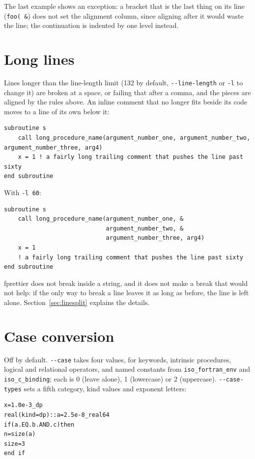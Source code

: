 \documentclass[11pt,a4paper,openany]{book}
\newcommand{\code}[1]{\texttt{\small #1}}
\newcommand{\flag}[1]{\texttt{\small -{}-#1}}
\begin{document}
The last example shows an exception: a bracket that is the last thing on its
line (\code{foo( \&}) does not set the alignment column, since aligning after
it would waste the line; the continuation is indented by one level instead.

\section{Long lines}

Lines longer than the line-length limit (132 by default, \flag{line-length}
or \code{-l} to change it) are broken at a space, or failing that after a comma,
and the pieces are aligned by the rules above. An inline comment that no longer
fits beside its code moves to a line of its own below it:

\begin{lstlisting}[style=before]
subroutine s
    call long_procedure_name(argument_number_one, argument_number_two, argument_number_three, arg4)
    x = 1 ! a fairly long trailing comment that pushes the line past sixty
end subroutine
\end{lstlisting}

With \code{-l 60}:

\begin{lstlisting}[style=after]
subroutine s
    call long_procedure_name(argument_number_one, &
                             argument_number_two, &
                             argument_number_three, arg4)
    x = 1
    ! a fairly long trailing comment that pushes the line past sixty
end subroutine
\end{lstlisting}

fprettier does not break inside a string, and it does not make a break that
would not help: if the only way to break a line leaves it as long as before, the
line is left alone. Section~\ref{sec:linesplit} explains the details.

\section{Case conversion}

Off by default. \flag{case} takes four values, for keywords, intrinsic
procedures, logical and relational operators, and named constants from
\code{iso\_fortran\_env} and \code{iso\_c\_binding}; each is 0 (leave alone),
1 (lowercase) or 2 (uppercase). \flag{case-types} sets a fifth category, kind
values and exponent letters:

\begin{lstlisting}[style=before]
x=1.0e-3_dp
real(kind=dp)::a=2.5e-8_real64
if(a.EQ.b.AND.c)then
n=size(a)
size=3
end if
\end{lstlisting}
\end{document}
